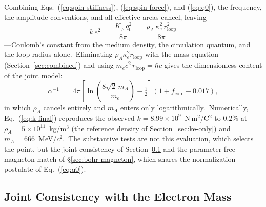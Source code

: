 \documentclass[12pt,letterpaper]{article}
\newcommand{\rhoa}{\rho_{\!A}}
\newcommand{\rloop}{r_{\mathrm{loop}}}
\begin{document}
Combining Eqs.~(\ref{eq:spin-stiffness}), (\ref{eq:spin-force}), and
(\ref{eq:q0}), the frequency, the amplitude conventions, and all
effective areas cancel, leaving
%
\begin{equation}
  \boxed{\;k\,e^2 \;=\; \frac{K_\varphi\,q_0^2}{8\pi}
  \;=\; \frac{\rhoa\,\kappa_e^2\,\rloop^2}{8\pi}\;}
  \label{eq:k-final}
\end{equation}
%
---Coulomb's constant from the medium density, the circulation quantum,
and the loop radius alone.\ Eliminating $\rhoa\kappa_e^2\rloop$ with the
mass equation (Section~\ref{sec:combined}) and using
$m_e c^2\, \rloop = \hbar c$ gives the dimensionless content of the
joint model:
%
\begin{equation}
  \alpha^{-1} \;=\; 4\pi \left[\ln\!\left(\frac{8\sqrt{2}\,m_A}{m_e}\right)
  - \tfrac{1}{2}\right]\left(1 + f_{\mathrm{core}} - 0.017\right),
  \label{eq:alpha-master}
\end{equation}
%
in which $\rhoa$ cancels entirely and $m_A$ enters only
logarithmically.\ Numerically, Eq.~(\ref{eq:k-final}) reproduces the
observed $k = 8.99\times10^{9}$~N\,m$^2$/C$^2$ to $0.2\%$ at
$\rhoa = 5\times10^{11}$~kg/m$^3$ (the reference density of
Section~\ref{sec:ke-only}) and $m_A = 666$~MeV/$c^2$.\ The substantive
tests are not this evaluation, which selects the point, but the joint
consistency of Section~\ref{sec:k-cross-check} and the parameter-free
magneton match of §\ref{sec:bohr-magneton}, which shares the
normalization postulate of Eq.~(\ref{eq:q0}).

\subsection{Joint Consistency with the Electron Mass}
\label{sec:k-cross-check}
\end{document}
